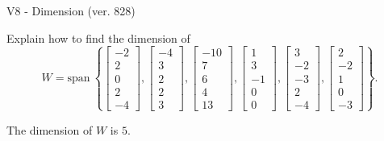 \begin{exercise}
  \begin{exerciseTitle}V8 - Dimension (ver. 828)\end{exerciseTitle}
  \begin{exerciseStatement}
    Explain how to find the dimension of 
\[W=\mathrm{span}\ \left\{\left[\begin{array}{r}
-2 \\
2 \\
0 \\
2 \\
-4
\end{array}\right] , \left[\begin{array}{r}
-4 \\
3 \\
2 \\
2 \\
3
\end{array}\right] , \left[\begin{array}{r}
-10 \\
7 \\
6 \\
4 \\
13
\end{array}\right] , \left[\begin{array}{r}
1 \\
3 \\
-1 \\
0 \\
0
\end{array}\right] , \left[\begin{array}{r}
3 \\
-2 \\
-3 \\
2 \\
-4
\end{array}\right] , \left[\begin{array}{r}
2 \\
-2 \\
1 \\
0 \\
-3
\end{array}\right]\right\}.\]



  \end{exerciseStatement}
  \begin{exerciseAnswer}
   The dimension of \(W\) is  \(5\).
  


  \end{exerciseAnswer}
\end{exercise}